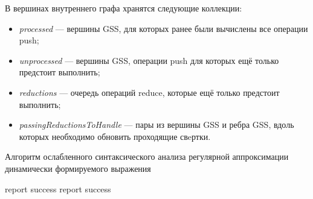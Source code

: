 В вершинах внутреннего графа хранятся следующие коллекции:
\begin{itemize}
  \item \emph{processed} --- вершины GSS, для которых ранее были вычислены все операции push;
  \item \emph{unprocessed} --- вершины GSS, операции push для которых ещё только предстоит выполнить;
  \item \emph{reductions} --- очередь операций reduce, которые ещё только предстоит выполнить;
  \item \emph{passingReductionsToHandle} --- пары из вершины GSS и ребра GSS, вдоль которых необходимо обновить проходящие свeртки.
\end{itemize}


\begin{algorithm}[H]
\begin{algorithmic}[1]
\caption{Алгоритм ослабленного синтаксического анализа регулярной аппроксимации динамически формируемого выражения}
\label{parsing}
     {report success}
    \EndIf
  \Else
    \EndWhile
     {report success}
    \EndIf
  \EndIf
\EndFunction
\end{algorithmic}
\end{algorithm}

